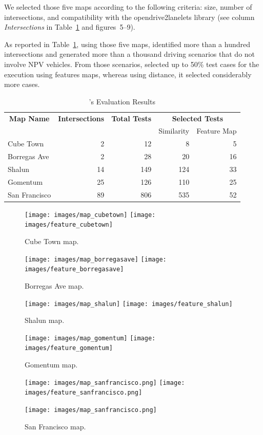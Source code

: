 \documentclass[conference]{IEEEtran}
\begin{document}
We selected those five maps according to the following criteria: size, number of intersections, and compatibility with the opendrive2lanelets library (see column \emph{Intersections} in Table~\ref{tab:results} and figures~5--9).

As reported in Table~\ref{tab:results}, using those five maps, \tool identified more than a hundred intersections and generated more than a thousand driving scenarios that do not involve NPV vehicles. From those scenarios, \tool selected up to 50\% test cases for the execution using features maps, whereas using distance, it selected considerably more cases.

\begin{table}[t]
    \centering
      \caption{\tool's Evaluation Results}
      \label{tab:results}
      \begin{tabular}{lrrrr}
        \toprule
        \multicolumn{1}{c}{\textbf{Map Name}}&
        \multicolumn{1}{c}{\textbf{Intersections}}&
        \multicolumn{1}{c}{\textbf{Total Tests}}&
        \multicolumn{2}{c}{\textbf{Selected Tests}} \\
        & & & Similarity & Feature Map\\
        \midrule
        Cube Town & 2 & 12 & 8 & 5\\
        Borregas Ave & 2 & 28 & 20 & 16\\
        Shalun & 14 & 149 & 124 & 33\\
        Gomentum & 25 & 126 & 110 & 25\\
        San Francisco & 89 & 806 & 535 & 52\\
        \bottomrule
      \end{tabular}
\end{table}



\begin{figure}[!tp]
  \texttt{[image: images/map\_cubetown]}
  \texttt{[image: images/feature\_cubetown]}
  \caption{Cube Town map.}
\endminipage\hfill
{}
  \texttt{[image: images/map\_borregasave]}
  \texttt{[image: images/feature\_borregasave]}
  \caption{Borregas Ave map.}
\endminipage\hfill
{}%
  \texttt{[image: images/map\_shalun]}
  \texttt{[image: images/feature\_shalun]}
  \caption{Shalun map.}
\endminipage

%
  \texttt{[image: images/map\_gomentum]}
  \texttt{[image: images/feature\_gomentum]}
  \caption{Gomentum map.}
\endminipage\hfill
{}%
  \texttt{[image: images/map\_sanfrancisco.png]}
  \texttt{[image: images/feature\_sanfrancisco.png]}
  \caption{San Francisco map.}
\endminipage
{}%
    \texttt{[image: images/map\_sanfrancisco.png]}
\endminipage
\label{fig:feature-maps-results}
\end{figure}
\end{document}
